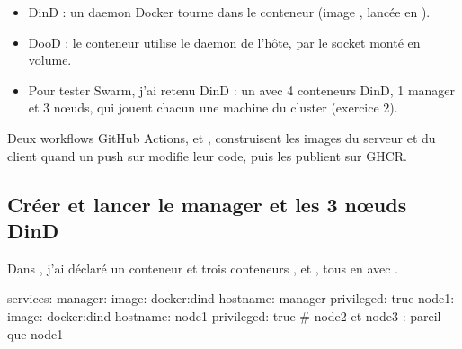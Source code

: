 

\begin{itemize}
  \item DinD : un daemon Docker tourne dans le conteneur (image , lancée en ).
  \item DooD : le conteneur utilise le daemon de l'hôte, par le socket  monté en volume.
  \item Pour tester Swarm, j'ai retenu DinD : un  avec 4 conteneurs DinD, 1 manager et 3 nœuds, qui jouent chacun une machine du cluster (exercice 2).
\end{itemize}


Deux workflows GitHub Actions,  et , construisent les images du serveur et du client quand un push sur  modifie leur code, puis les publient sur GHCR.

\begin{commandes}
\end{commandes}



\subsection{Créer et lancer le manager et les 3 nœuds DinD}

Dans , j'ai déclaré un conteneur  et trois conteneurs ,  et , tous en  avec .

\begin{fichier}
services:
  manager:
    image: docker:dind
    hostname: manager
    privileged: true
  node1:
    image: docker:dind
    hostname: node1
    privileged: true
  # node2 et node3 : pareil que node1
\end{fichier}

